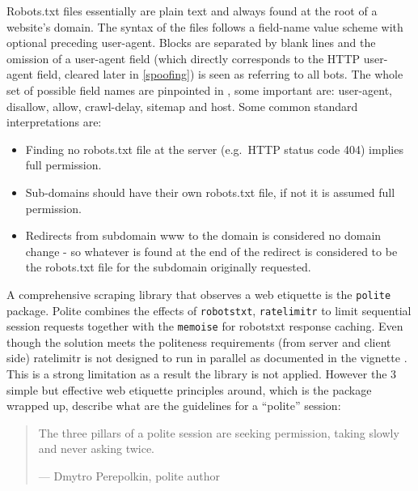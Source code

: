 \documentclass[
  12pt,
  a4paper,
  oneside]{book}
\providecommand{\tightlist}{%
  \setlength{\itemsep}{0pt}\setlength{\parskip}{0pt}}
\theoremstyle{definition}
\theoremstyle{definition}
\theoremstyle{definition}
\theoremstyle{remark}
\begin{document}
Robots.txt files \citep{robotstxt} essentially are plain text and always found at the root of a website's domain. The syntax of the files follows a field-name value scheme with optional preceding user-agent. Blocks are separated by blank lines and the omission of a user-agent field (which directly corresponds to the HTTP user-agent field, cleared later in \ref{spoofing}) is seen as referring to all bots. The whole set of possible field names are pinpointed in \citet{google:robottxt}, some important are: user-agent, disallow, allow, crawl-delay, sitemap and host. Some common standard interpretations are:

\begin{itemize}
\tightlist
\item
  Finding no robots.txt file at the server (e.g.~HTTP status code 404) implies full permission.
\item
  Sub-domains should have their own robots.txt file, if not it is assumed full permission.
\item
  Redirects from subdomain www to the domain is considered no domain change - so whatever is found at the end of the redirect is considered to be the robots.txt file for the subdomain originally requested.
\end{itemize}

A comprehensive scraping library that observes a web etiquette is the \texttt{polite} \citep{polite} package. Polite combines the effects of \texttt{robotstxt}, \texttt{ratelimitr} \citeyearpar{ratelimitr} to limit sequential session requests together with the \texttt{memoise} \citep{memoise} for robotstxt response caching. Even though the solution meets the politeness requirements (from server and client side) ratelimitr is not designed to run in parallel as documented in the vignette \citep{ratelimitr}. This is a strong limitation as a result the library is not applied. However the 3 simple but effective web etiquette principles around, which is the package wrapped up, describe what are the guidelines for a ``polite'' session:

\begin{quote}
The three pillars of a polite session are seeking permission, taking slowly and never asking twice.

\hfill --- Dmytro Perepolkin, polite author
\end{quote}
\end{document}
